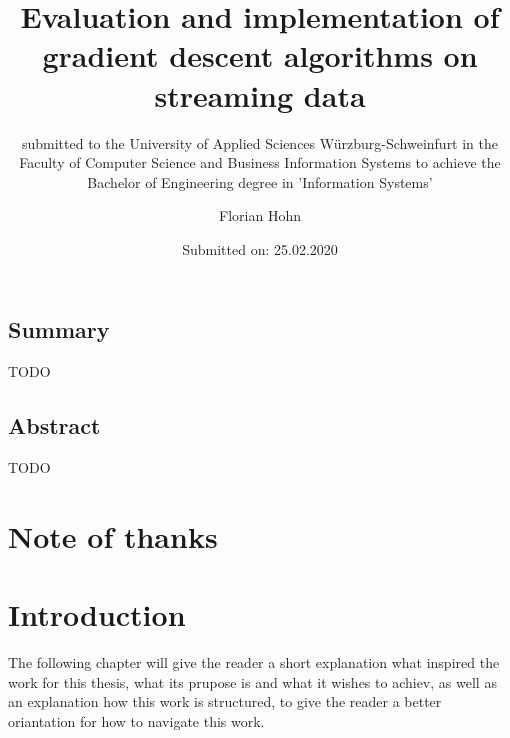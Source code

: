 \documentclass[12pt,oneside,a4paper,parskip]{scrbook}
\def\BaAuthor{Florian Hohn}
\def\BaTitle{Evaluation and implementation of gradient descent algorithms on streaming data}
\def\BaSupervisorOne{Prof.\ Dr.\ Frank-Michael Schleif}
\def\BaSupervisorTwo{Moritz Heusinger}
\def\BaDeadline{25.02.2020}
\begin{document}


\frontmatter
\titlehead{%
  {University of Applied Sciences W\"{u}rzburg-Schweinfurt
  Faculty of Computer Science and Business Information Systems}}
\subject{Bachelor-Thesis}
\title{\BaTitle\\[15mm]}
\subtitle{\normalsize{submitted to the University of Applied Sciences W\"{u}rzburg-Schweinfurt in the Faculty of Computer Science and Business Information Systems to achieve the Bachelor of Engineering degree in 'Information Systems'}}
\author{\BaAuthor}
\date{\normalsize{Submitted on: \BaDeadline}}
\publishers{
  \normalsize{First Reader: \BaSupervisorOne}\\
  \normalsize{Second Reader: \BaSupervisorTwo}\\
}


\maketitle



\section*{Summary}

TODO

\section*{Abstract}

TODO

\newpage
\chapter*{Note of thanks}

\tableofcontents	




\mainmatter

\chapter{Introduction}\label{ch:intro}

The following chapter will give the reader a short explanation what inspired the work for this thesis, what its prupose is 
and what it wishes to achiev, as well as an explanation how this work is structured, to give the reader a better oriantation 
for how to navigate this work.
\end{document}
